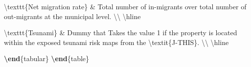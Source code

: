 \documentclass[
  letterpaper,
  DIV=11,
  numbers=noendperiod]{scrartcl}
\newenvironment{Shaded}{\begin{snugshade}}{\end{snugshade}}
\newcommand{\ExtensionTok}[1]{\textcolor[rgb]{0.00,0.23,0.31}{#1}}
\newcommand{\FunctionTok}[1]{\textcolor[rgb]{0.28,0.35,0.67}{#1}}
\newcommand{\KeywordTok}[1]{\textcolor[rgb]{0.00,0.23,0.31}{\textbf{#1}}}
\newcommand{\NormalTok}[1]{\textcolor[rgb]{0.00,0.23,0.31}{#1}}
\newcommand{\OperatorTok}[1]{\textcolor[rgb]{0.37,0.37,0.37}{#1}}
\begin{document}
\begin{Shaded}
\begin{Highlighting}[]
\FunctionTok{\textbackslash{}texttt}\NormalTok{\{Net migration rate\} }\OperatorTok{\&}\NormalTok{ Total number of in{-}migrants over total number of out{-}migrants at the municipal level. }\FunctionTok{\textbackslash{}\textbackslash{}}
\FunctionTok{\textbackslash{}hline}

\FunctionTok{\textbackslash{}texttt}\NormalTok{\{Tsunami\} }\OperatorTok{\&}\NormalTok{ Dummy that Takes the value 1 if the property is located within the exposed tsunami risk maps from the }\FunctionTok{\textbackslash{}textit}\NormalTok{\{J{-}THIS\}. }\FunctionTok{\textbackslash{}\textbackslash{}}
\FunctionTok{\textbackslash{}hline}

\KeywordTok{\textbackslash{}end}\NormalTok{\{}\ExtensionTok{tabular}\NormalTok{\}}
\KeywordTok{\textbackslash{}end}\NormalTok{\{}\ExtensionTok{table}\NormalTok{\}}
\end{Highlighting}
\end{Shaded}
\end{document}
